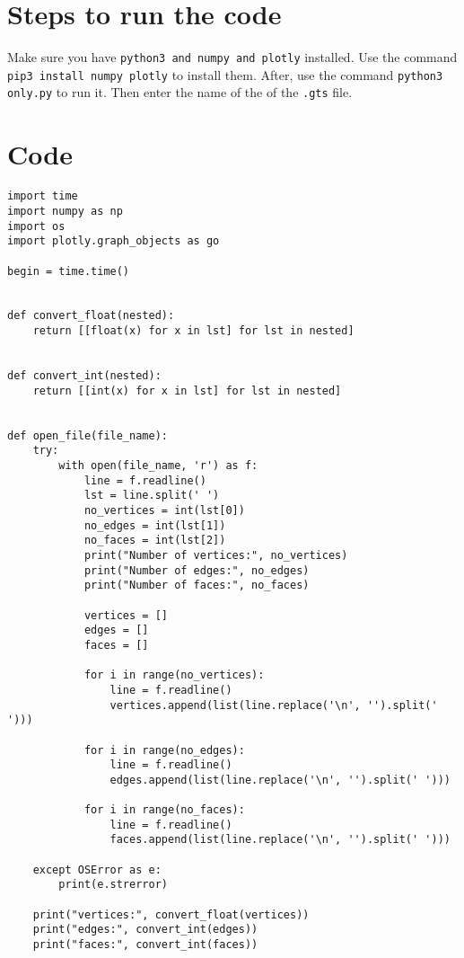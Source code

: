 \documentclass[11pt]{article}
\begin{document}
\section{Steps to run the code}
Make sure you have \ttfamily \texttt{python3 and numpy and plotly} \normalfont installed. 
Use the command \ttfamily \texttt{pip3 install numpy plotly}  \normalfont to install them.
After, use the command \ttfamily \texttt{python3 only.py} \normalfont to run it. Then enter the name of the of the \ttfamily \texttt{.gts} \normalfont file.

\section{Code}
\begin{verbatim}
import time
import numpy as np
import os
import plotly.graph_objects as go

begin = time.time()


def convert_float(nested):
    return [[float(x) for x in lst] for lst in nested]


def convert_int(nested):
    return [[int(x) for x in lst] for lst in nested]


def open_file(file_name):
    try:
        with open(file_name, 'r') as f:
            line = f.readline()
            lst = line.split(' ')
            no_vertices = int(lst[0])
            no_edges = int(lst[1])
            no_faces = int(lst[2])
            print("Number of vertices:", no_vertices)
            print("Number of edges:", no_edges)
            print("Number of faces:", no_faces)

            vertices = []
            edges = []
            faces = []

            for i in range(no_vertices):
                line = f.readline()
                vertices.append(list(line.replace('\n', '').split(' ')))

            for i in range(no_edges):
                line = f.readline()
                edges.append(list(line.replace('\n', '').split(' ')))

            for i in range(no_faces):
                line = f.readline()
                faces.append(list(line.replace('\n', '').split(' ')))

    except OSError as e:
        print(e.strerror)

    print("vertices:", convert_float(vertices))
    print("edges:", convert_int(edges))
    print("faces:", convert_int(faces))


\end{verbatim}
\end{document}
